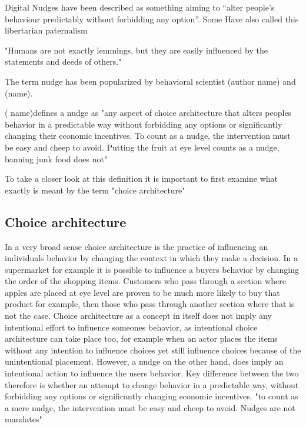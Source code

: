 
Digital Nudges \cite{Leonard2008Dec} have been described
as something aiming to “alter people’s behaviour predictably
without forbidding any option”.
Some Have also called this libertarian paternalism \cite{Leonard2008Dec}

"Humans are not exactly lemmings, but they are easily influenced by the statements and deeds of others." \cite{Leonard2008Dec}



The term nudge has been popularized by behavioral scientist (author name) and (name).

( name)defines a nudge as "any aspect of choice architecture that alters peoples behavior in a
predictable way without forbidding any options or  significantly changing their economic incentives.
To count as a nudge, the intervention must be easy and cheep to avoid. Putting the fruit at eye level counts as a nudge, banning junk food does not"

To take a closer look at this definition it is important to first examine what exactly is meant by the term "choice architecture"

\subsection{Choice architecture}
In a very broad sense choice architecture is the practice of influencing an individuals behavior by changing the context in which they make a decision. In a supermarket for example it is possible to influence a buyers behavior by changing the order of the shopping items. Customers who pass through a section where apples are placed at eye level are proven to be much more likely to buy that product for example, then those who pass through another section where that is not the case. Choice architecture as a concept in itself does not imply any intentional effort to influence someones behavior, as intentional choice architecture can take place too, for example when an actor places the items without any intention to influence choices yet still influence choices because of the unintentional placement.
However, a  nudge on the other hand, does imply an intentional action to influence the users behavior. Key difference between the two therefore is whether an attempt to change behavior in a predictable way, without forbidding any options or significantly changing economic incentives. "to count as a mere nudge, the intervention must be easy and cheep to avoid. Nudges are not mandates"

